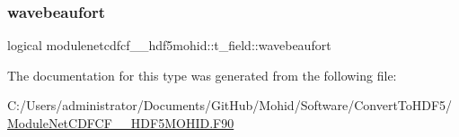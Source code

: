 \mbox{\label{structmodulenetcdfcf__2__hdf5mohid_1_1t__field_a9dcf8940fc8f6aeb1add0506a601f13e}} 
\subsubsection{\texorpdfstring{wavebeaufort}{wavebeaufort}}
{\footnotesize\ttfamily logical modulenetcdfcf\+\_\+\_\+hdf5mohid\+::t\+\_\+field\+::wavebeaufort\hspace{0.3cm}{\ttfamily [private]}}



The documentation for this type was generated from the following file\+:\begin{DoxyCompactItemize}
\item 
C\+:/\+Users/administrator/\+Documents/\+Git\+Hub/\+Mohid/\+Software/\+Convert\+To\+H\+D\+F5/\mbox{\hyperlink{_module_net_c_d_f_c_f__2___h_d_f5_m_o_h_i_d_8_f90}{Module\+Net\+C\+D\+F\+C\+F\+\_\+\_\+\+H\+D\+F5\+M\+O\+H\+I\+D.\+F90}}\end{DoxyCompactItemize}
